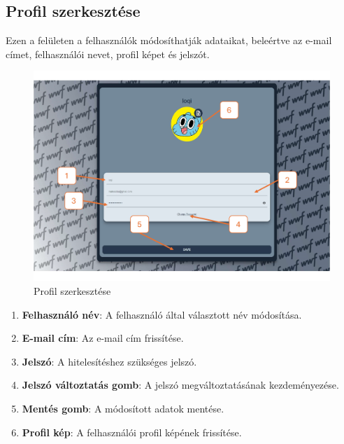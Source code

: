 \subsection{Profil szerkeszt\'ese}
Ezen a felületen a felhasználók módosíthatják adataikat, beleértve az e-mail címet, felhasználói nevet, profil képet és jelszót.
\begin{figure}[H]
    \centering
    \includegraphics[width=14.0truecm]{images/profil.pdf}
    \caption{Profil szerkesztése}
    \label{fig:login}
\end{figure}
\begin{enumerate}
  \item \textbf{Felhasználó név}: A felhasználó által választott név módosítása.
  \item \textbf{E-mail cím}: Az e-mail cím frissítése.
  \item \textbf{Jelszó}: A hitelesítéshez szükséges jelszó.
  \item \textbf{Jelszó változtatás gomb}: A jelszó megváltoztatásának kezdeményezése.
  \item \textbf{Mentés gomb}: A módosított adatok mentése.
  \item \textbf{Profil kép}: A felhasználói profil képének frissítése.
\end{enumerate}
